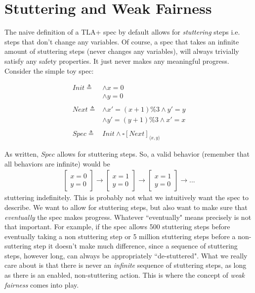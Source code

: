 \documentclass[11pt, oneside]{article}   	%
\begin{document}
\section*{Stuttering and Weak Fairness}

The naive definition of a TLA+ spec by default allows for \textit{stuttering} steps i.e. steps that don't change any variables. Of course, a spec that takes an infinite amount of stuttering steps (never changes any variables), will always trivially satisfy any safety properties. It just never makes any meaningful progress. Consider the simple toy spec:

\begin{align*}
Init \triangleq 
& \wedge x = 0 \\
& \wedge y =0 \\\\
Next \triangleq 
& \wedge x' = (x+1) \% 3 \wedge y'=y \\
& \wedge y' = (y+1) \% 3 \wedge x'=x\\\\
Spec \triangleq & Init \wedge \square[Next]_{\langle x, y \rangle}
\end{align*}

\noindent As written, $Spec$ allows for stuttering steps. So, a valid behavior (remember that all behaviors are infinite) would be
\begin{align*}
\begin{bmatrix}
x=0 \\ y=0 
\end{bmatrix}
\rightarrow
\begin{bmatrix}
x=1 \\ y=0 
\end{bmatrix}
\rightarrow
\begin{bmatrix}
x=1 \\ y=0 
\end{bmatrix}
\rightarrow ...
\end{align*}
stuttering indefinitely. This is probably not what we intuitively want the spec to describe. We want to allow for stuttering steps, but also want to make sure that \textit{eventually} the spec makes progress. Whatever ``eventually" means precisely is not that important. For example, if the spec allows 500 stuttering steps before eventually taking a non stuttering step or 5 million stuttering steps before a non-suttering step it doesn't make much difference, since a sequence of stuttering steps, however long, can always be appropriately ``de-stuttered". What we really care about is that there is never an \textit{infinite} sequence of stuttering steps, as long as there is an enabled, non-stuttering action. This is where the concept of \textit{weak fairness} comes into play. 
\end{document}
